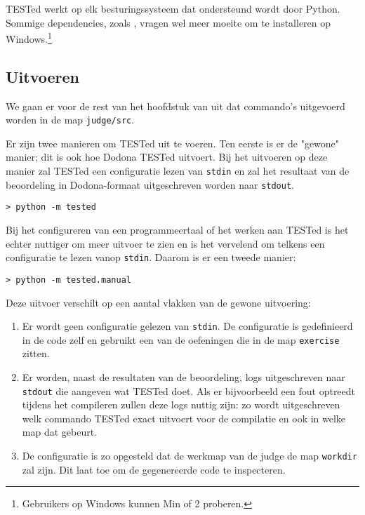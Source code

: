 TESTed werkt op elk besturingssysteem dat ondersteund wordt door Python.
Sommige dependencies, zoals , vragen wel meer moeite om te installeren op Windows.\footnote{Gebruikers op Windows kunnen Min of 2 proberen.}

\subsection{Uitvoeren}\label{subsec:uitvoeren}

We gaan er voor de rest van het hoofdstuk van uit dat commando's uitgevoerd worden in de map \texttt{judge/src}.

Er zijn twee manieren om TESTed uit te voeren.
Ten eerste is er de "gewone" manier;
dit is ook hoe Dodona TESTed uitvoert.
Bij het uitvoeren op deze manier zal TESTed een configuratie lezen van \texttt{stdin} en zal het resultaat van de beoordeling in Dodona-formaat uitgeschreven worden naar \texttt{stdout}.

\begin{verbatim}
> python -m tested
\end{verbatim}

Bij het configureren van een programmeertaal of het werken aan TESTed is het echter nuttiger om meer uitvoer te zien en is het vervelend om telkens een configuratie te lezen vanop \texttt{stdin}.
Daarom is er een tweede manier:

\begin{verbatim}
> python -m tested.manual
\end{verbatim}

Deze uitvoer verschilt op een aantal vlakken van de gewone uitvoering:

\begin{enumerate}
    \item Er wordt geen configuratie gelezen van \texttt{stdin}.
    De configuratie is gedefinieerd in de code zelf en gebruikt een van de oefeningen die in de map \texttt{exercise} zitten.
    \item Er worden, naast de resultaten van de beoordeling, logs uitgeschreven naar \texttt{stdout} die aangeven wat TESTed doet.
    Als er bijvoorbeeld een fout optreedt tijdens het compileren zullen deze logs nuttig zijn: zo wordt uitgeschreven welk commando TESTed exact uitvoert voor de compilatie en ook in welke map dat gebeurt.
    \item De configuratie is zo opgesteld dat de werkmap van de judge de map \texttt{workdir} zal zijn.
    Dit laat toe om de gegenereerde code te inspecteren.
\end{enumerate}


